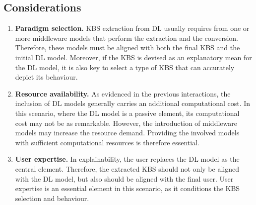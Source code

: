 \subsection{Considerations}
\begin{enumerate} [start=1,label={\bfseries C\arabic*.}]
    \item \textbf{Paradigm selection.} \label{kbsextradl_C_paradigm} KBS extraction from DL usually requires from one or more middleware models that perform the extraction and the conversion. Therefore, these models must be aligned with both the final KBS and the initial DL model. Moreover, if the KBS is devised as an explanatory mean for the DL model, it is also key to select a type of KBS that can accurately depict its behaviour.
    
    \item \textbf{Resource availability.} \label{kbsextradl_C_resource} As evidenced in the previous interactions, the inclusion of DL models generally carries an additional computational cost. In this scenario, where the DL model is a passive element, its computational cost may not be as remarkable. However, the introduction of middleware models may increase the resource demand. Providing the involved models with sufficient computational resources is therefore essential.
    
    \item \textbf{User expertise.} \label{kbsextradl_C_user} In explainability, the user replaces the DL model as the central element. Therefore, the extracted KBS should not only be aligned with the DL model, but also should be aligned with the final user. User expertise is an essential element in this scenario, as it conditions the KBS selection and behaviour.
\end{enumerate}

